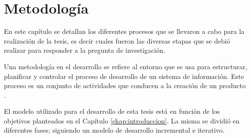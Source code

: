 \chapter{Metodología}\label{chap:metodologia}
En este capítulo se detallan los diferentes procesos que se llevaron a cabo para la realización de la tesis, es decir cuales fueron las diversas etapas que se debió realizar para responder a la pregunta de investigación.

\begin{center}
\begin{minipage}{0.8\linewidth}  \vspace{5pt} {\small
Una metodología en el desarrollo se refiere al entorno que se usa para estructurar, planificar y controlar el proceso de desarrollo de un sistema de información. Este proceso es un conjunto de actividades que conducen a la creación de un producto .}
\begin{flushright}
  \citep{sommerville}
\end{flushright}
\end{minipage}
\end{center}

El modelo utilizado para el desarrollo de esta tesis está en función de los objetivos planteados en el Capítulo \ref{chap:introduccion}. La misma se dividió en diferentes fases; siguiendo un modelo de desarrollo incremental e iterativo.

